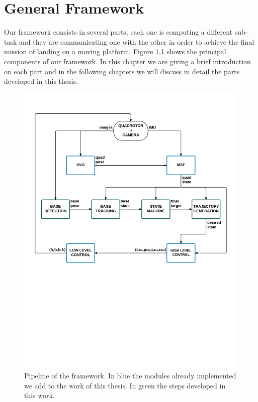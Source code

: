 \chapter{General Framework}\label{chap:general_framework}
Our framework consists in several parts, each one is computing a different sub-task and they are communicating one with the other in order to achieve the final mission of landing on a moving platform. Figure \ref{fig:pipeline_diagram} shows the principal components of our framework. In this chapter we are giving a brief introduction on each part and in the following chapters we will discuss in detail the parts developed in this thesis.
\begin{figure}[!ht]
    \centering
    \includegraphics[width=1.0\textwidth]{img/pipeline_diagram.pdf}
    \caption{Pipeline of the framework. In blue the modules already implemented we add to the work of this thesis. In green the steps developed in this work.}
    \label{fig:pipeline_diagram}
\end{figure}

